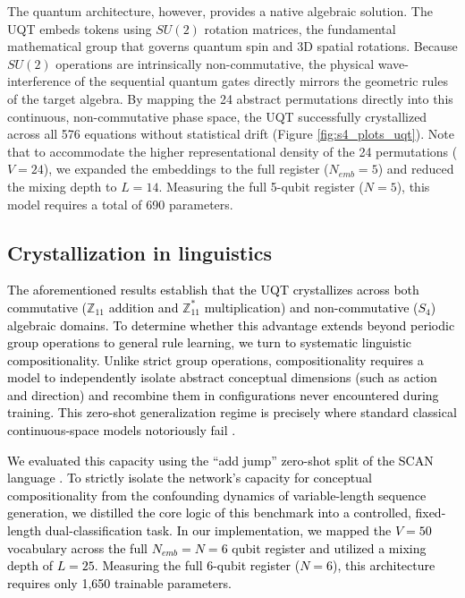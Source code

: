 \documentclass[11pt, a4paper]{article}
\begin{document}
The quantum architecture, however, provides a native algebraic solution. The UQT embeds tokens using $SU(2)$ rotation matrices, the fundamental mathematical group that governs quantum spin and 3D spatial rotations. Because $SU(2)$ operations are intrinsically non-commutative, the physical wave-interference of the sequential quantum gates directly mirrors the geometric rules of the target algebra. By mapping the 24 abstract permutations directly into this continuous, non-commutative phase space, the UQT successfully crystallized across all 576 equations without statistical drift (Figure \ref{fig:s4_plots_uqt}). Note that to accommodate the higher representational density of the 24 permutations ($V=24$), we expanded the embeddings to the full register ($N_{emb}=5$) and reduced the mixing depth to $L=14$. Measuring the full 5-qubit register ($N=5$), this model requires a total of 690 parameters.

\subsection*{Crystallization in linguistics}

\textcolor{black}{The aforementioned results establish that the UQT crystallizes across both commutative ($\mathbb{Z}_{11}$ addition and $\mathbb{Z}_{11}^{*}$ multiplication) and non-commutative ($S_4$) algebraic domains. To determine whether this advantage extends beyond periodic group operations to general rule learning, we turn to systematic linguistic compositionality. Unlike strict group operations, compositionality requires a model to independently isolate abstract conceptual dimensions (such as action and direction) and recombine them in configurations never encountered during training. This zero-shot generalization regime is precisely where standard classical continuous-space models notoriously fail \cite{lake2018generalization}.}

\textcolor{black}{We evaluated this capacity using the ``add jump'' zero-shot split of the SCAN language \cite{lake2018generalization}. To strictly isolate the network's capacity for conceptual compositionality from the confounding dynamics of variable-length sequence generation, we distilled the core logic of this benchmark into a controlled, fixed-length dual-classification task. In our implementation, we mapped the $V=50$ vocabulary across the full $N_{emb}=N=6$ qubit register and utilized a mixing depth of $L=25$. Measuring the full 6-qubit register ($N=6$), this architecture requires only 1,650 trainable parameters.}
\end{document}
